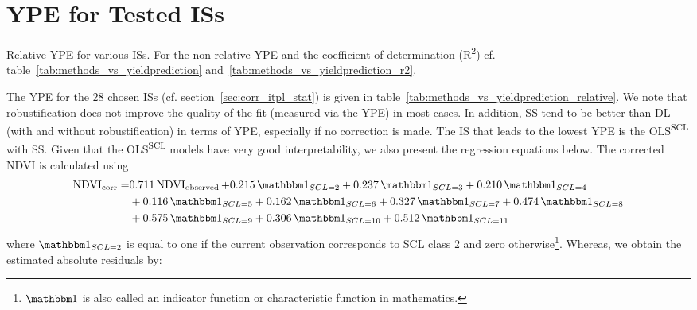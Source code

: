 \section{YPE for Tested ISs} \label{sec:results_ndvi_corr}
	\begin{table}
		\begin{center}
			\caption[Relative Yield Estimation Error for ISs]{Relative YPE for various ISs. For the non-relative YPE and the coefficient of determination (R\textsuperscript{2}) cf. table~\ref{tab:methods_vs_yieldprediction} and~\ref{tab:methods_vs_yieldprediction_r2}.}
			\small
			
			\label{tab:methods_vs_yieldprediction_relative}
			\normalsize
		\end{center}
	\end{table}
	The YPE for the 28 chosen {{IS}}s (cf. section~\ref{sec:corr_itpl_stat}) is given in table~\ref{tab:methods_vs_yieldprediction_relative}. We note that robustification does not improve the quality of the fit (measured via the YPE) in most cases. 
	In addition, SS tend to be better than DL (with and without robustification) in terms of YPE, especially if no correction is made. The {{IS}} that leads to the lowest YPE is the OLS\textsuperscript{SCL} with SS. Given that the OLS\textsuperscript{SCL} models have very good interpretability, we also present the regression equations below. The corrected NDVI is calculated using 
	\begin{equation}\label{eq:corr_lm}
		\begin{aligned}		
			{\operatorname{NDVI}}_{\text{corr}}  = &
			0.711 \operatorname{NDVI}_\text{observed}  
			+ 0.215 \,\mathbbm 1_{{SCL = 2}} 
			+ 0.237 \,\mathbbm 1_{{SCL = 3}} 
			+ 0.210 \,\mathbbm 1_{{SCL = 4}} \\ &
			+ 0.116 \,\mathbbm 1_{{SCL = 5}} 
			+ 0.162 \,\mathbbm 1_{{SCL = 6}} 
			+ 0.327 \,\mathbbm 1_{{SCL = 7}} 
			+ 0.474 \,\mathbbm 1_{{SCL = 8}} \\ &
			+ 0.575 \,\mathbbm 1_{{SCL = 9}} 
			+ 0.306 \,\mathbbm 1_{{SCL = 10}} 
			+ 0.512 \,\mathbbm 1_{{SCL = 11}} 
		\end{aligned}
	\end{equation} 
	where $\mathbbm 1_{{SCL = 2}}$ is equal to one if the current observation corresponds to SCL class 2 and zero otherwise\footnote{$\mathbbm 1$ is also called an indicator function or characteristic function in mathematics.}. Whereas, we obtain the estimated absolute residuals by: 
